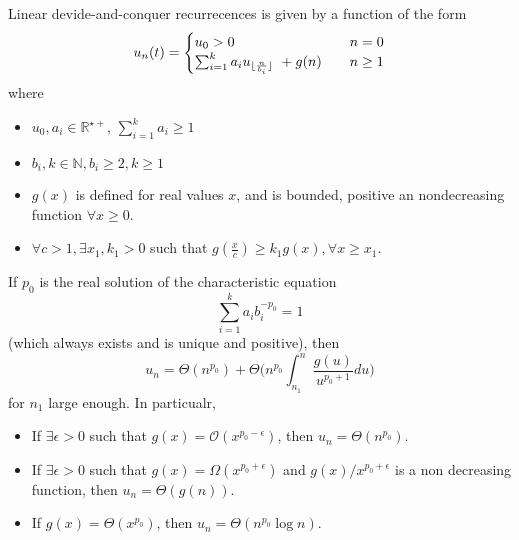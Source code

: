 	Linear devide-and-conquer recurrecences is given by a function of the form
	\begin{equation}
	 u_n(t) = 
	 	\begin{cases}
				u_0 > 0 & n= 0 \\
				\sum_{i=1}^k a_i u_{\lfloor\frac{n}{b_i}\rfloor} \ + g(n) \quad &n  \geq 1 
		\end{cases}
	 \end{equation}
	 where
	 \begin{itemize}
		 \item $u_0, a_i \in \mathbb{R}^{\star+}$, $\sum_{i=1}^k a_i \geq 1$
		 \item $b_{i}, k \in \mathbb{N}, b_i \geq 2, k\geq 1$
		 \item $g(x)$ is defined for real values $x$, and is bounded, positive an nondecreasing function $\forall x\geq 0$.
	 	\item $\forall c > 1, \exists x_1, k_1 >0$ such that $g(\frac{x}{c}) \geq k_1 g(x), \forall x \geq x_1$. 
	 \end{itemize}
 
 \begin{theorem}
 	\label{thm:AkraAndBazzi}
	 If $p_0$ is the real solution of the characteristic equation
	 \begin{equation}
	 \label{eq:characteristicequation}
	 \sum_{i=1}^k a_i b_i ^{-p_0} = 1
	 \end{equation}
	 (which always exists and is unique and positive), then 
	 \begin{equation}
		 u_n = \Theta(n^{p_0}) + \Theta \Big( n^{p_0} \int_{n_1}^n \frac{g(u)}{u^{p_0+1}}  du \Big)
	 \end{equation}
	 for $n_1$ large enough. In particualr,
	 \begin{itemize}
	 	\item If $\exists \epsilon >0$ such that $g(x)=\mathcal{O}(x^{p_0-\epsilon})$, then $u_n = \Theta (n^{p_0})$.
	 	\item If $\exists \epsilon > 0$ such that $g(x) = \Omega(x^{p_0 + \epsilon})$ and $g(x)/ x^{p_0+\epsilon}$ is a non decreasing function, then $u_n = \Theta(g(n))$.
	 	\item If $g(x) = \Theta(x^{p_0})$, then $u_{n} = \Theta(n^{p_0} \log n)$. 
	 	\end{itemize}
	\end{theorem}
 
